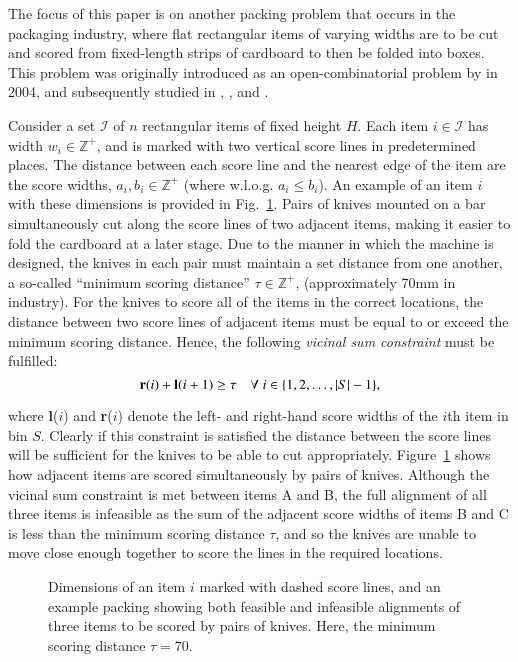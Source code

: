 \documentclass[authoryear]{elsarticle}
\begin{document}
The focus of this paper is on another packing problem that occurs in the packaging industry, where flat rectangular items of varying widths are to be cut and scored from fixed-length strips of cardboard to then be folded into boxes. This problem was originally introduced as an open-combinatorial problem by \citeauthor{goulimis2004} in 2004, and subsequently studied in \citet{lewis2011}, \citet{becker2015}, and \citet{hawa2018}.

Consider a set $\mathcal{I}$ of $n$ rectangular items of fixed height $H$. Each item $i \in \mathcal{I}$ has width $w_i \in \mathbb{Z}^+$, and is marked with two vertical score lines in predetermined places. The distance between each score line and the nearest edge of the item are the score widths, $a_i, b_i \in \mathbb{Z}^+$ (where w.l.o.g. $a_i \leq b_i$). An example of an item $i$ with these dimensions is provided in Fig.~\ref{fig:itemsdimknives}. Pairs of knives mounted on a bar simultaneously cut along the score lines of two adjacent items, making it easier to fold the cardboard at a later stage. Due to the manner in which the machine is designed, the knives in each pair must maintain a set distance from one another, a so-called ``minimum scoring distance'' $\tau \in \mathbb{Z}^+$, (approximately 70mm in industry). For the knives to score all of the items in the correct locations, the distance between two score lines of adjacent items must be equal to or exceed the minimum scoring distance. Hence, the following \emph{vicinal sum constraint} must be fulfilled:
\begin{equation}
	\textbf{r}(i) + \textbf{l}(i+1) \geq \tau \quad \forall \hspace{1mm} i \in \{1,2,\dotsc,|S|- 1\},
	\label{eqn:vsc}
\end{equation}

\noindent where \textbf{l}($i$) and \textbf{r}($i$) denote the left- and right-hand score widths of the $i$th item in bin $S$. Clearly if this constraint is satisfied the distance between the score lines will be sufficient for the knives to be able to cut appropriately. Figure~\ref{fig:itemsdimknives} shows how adjacent items are scored simultaneously by pairs of knives. Although the vicinal sum constraint is met between items A and B, the full alignment of all three items is infeasible as the sum of the adjacent score widths of items B and C is less than the minimum scoring distance $\tau$, and so the knives are unable to move close enough together to score the lines in the required locations.
\begin{figure}[H]	
	\centering
	
	\caption{Dimensions of an item $i$ marked with dashed score lines, and an example packing showing both feasible and infeasible alignments of three items to be scored by pairs of knives. Here, the minimum scoring distance $\tau = 70$.}	
	\label{fig:itemsdimknives}
\end{figure}
\end{document}
